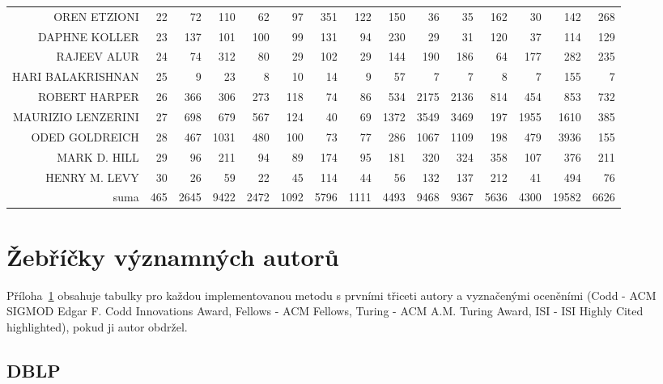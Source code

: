 \documentclass{bakalarka}
\begin{document}
\begin{table}[!ht]
\begin{sideways}
\begin{scriptsize}
\begin{tabular}{r|r|rrrrrrrrrrrrr}
OREN ETZIONI&22&72&110&62&97&351&122&150&36&35&162&30&142&268\\
DAPHNE KOLLER&23&137&101&100&99&131&94&230&29&31&120&37&114&129\\
RAJEEV ALUR&24&74&312&80&29&102&29&144&190&186&64&177&282&235\\
HARI BALAKRISHNAN&25&9&23&8&10&14&9&57&7&7&8&7&155&7\\
ROBERT HARPER&26&366&306&273&118&74&86&534&2175&2136&814&454&853&732\\
MAURIZIO LENZERINI&27&698&679&567&124&40&69&1372&3549&3469&197&1955&1610&385\\
ODED GOLDREICH&28&467&1031&480&100&73&77&286&1067&1109&198&479&3936&155\\
MARK D. HILL&29&96&211&94&89&174&95&181&320&324&358&107&376&211\\
HENRY M. LEVY&30&26&59&22&45&114&44&56&132&137&212&41&494&76\\
\midrule
suma&465&2645&9422&2472&1092&5796&1111&4493&9468&9367&5636&4300&19582&6626\\
\bottomrule
\end{tabular}
\end{scriptsize}
\end{sideways}
\end{table}

\newpage
\chapter{Žebříčky významných autorů}
\label{chapter:zebricky}

Příloha~\ref{chapter:zebricky} obsahuje tabulky pro každou implementovanou
metodu s prvními třiceti autory a vyznačenými oceněními (Codd - ACM SIGMOD
Edgar F. Codd Innovations Award, Fellows - ACM Fellows, Turing - ACM A.M.
Turing Award, ISI - ISI Highly Cited highlighted), pokud ji autor obdržel.

\newpage
\section{DBLP}
\label{section:zebrickydblp}















\end{document}
